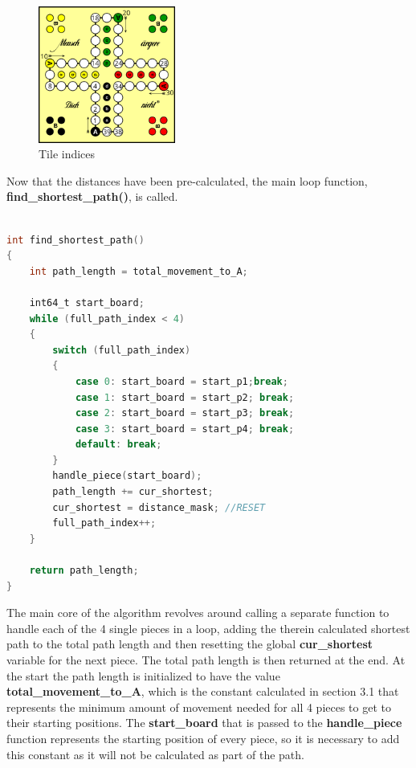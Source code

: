 \documentclass[12pt]{article}
\begin{document}
\begin{figure}[htbp]
    \centering
    \includegraphics[width=0.4\textwidth]{images/Figure7}
    \caption{Tile indices}
    \label{fig:tile-indices}
\end{figure}

\newpage

Now that the distances have been pre-calculated, the main loop function, \textbf{find\_shortest\_path()}, is called.

\begin{lstlisting}[language=C, caption={Find shortest path}, label={lst:find-shortest-path}]

int find_shortest_path()
{
    int path_length = total_movement_to_A;

    int64_t start_board;
    while (full_path_index < 4)
    {
        switch (full_path_index)
        {
            case 0: start_board = start_p1;break;
            case 1: start_board = start_p2; break;
            case 2: start_board = start_p3; break;
            case 3: start_board = start_p4; break;
            default: break;
        }
        handle_piece(start_board);
        path_length += cur_shortest;
        cur_shortest = distance_mask; //RESET
        full_path_index++;
    }

    return path_length;
}
\end{lstlisting}

The main core of the algorithm revolves around calling a separate function to handle each of the 4 single pieces in a loop, adding the therein calculated shortest path to the total path length and then resetting the global \textbf{cur\_shortest} variable for the next piece. The total path length is then returned at the end. At the start the path length is initialized to have the value \textbf{total\_movement\_to\_A}, which is the constant calculated in section 3.1 that represents the minimum amount of movement needed for all 4 pieces to get to their starting positions. The \textbf{start\_board} that is passed to the \textbf{handle\_piece} function represents the starting position of every piece, so it is necessary to add this constant as it will not be calculated as part of the path.
\end{document}
